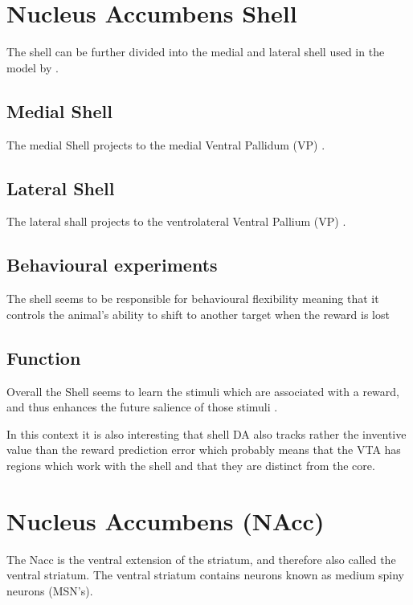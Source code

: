 \documentclass[12pt,a4paper]{article}
\let\oldsection\section
\renewcommand\section{\clearpage\oldsection}
\begin{document}
\section{Nucleus Accumbens Shell}

The shell can be further divided into the medial and lateral shell \citep{Ikemoto2007} \citep{Usuda1998} used in the model by \citep{Humphries2010}.

\subsection{Medial Shell}

The medial Shell projects to the medial Ventral Pallidum (VP) \citep{Ikemoto2007}.

\subsection{Lateral Shell}

The lateral shall projects to the ventrolateral Ventral Pallium (VP) \citep{Ikemoto2007}.


\subsection{Behavioural experiments}

The shell seems to be responsible for behavioural flexibility meaning that it controls the animal's ability to shift to another target when the reward is lost \citep{Aquili2014}

\subsection{Function}

Overall the Shell seems to learn the stimuli which are associated with a reward, and thus enhances the future salience of those stimuli \citep{Cassidy2017}.

In this context it is also interesting that shell DA also tracks rather the inventive value than the reward prediction error \citep{Sackett2017} which probably means that the VTA has regions which work with the shell and that they are distinct from the core.




\section{Nucleus Accumbens (NAcc)}

The Nacc is the ventral extension of the striatum, and therefore also called the ventral striatum.  The ventral striatum contains neurons known as medium spiny neurons (MSN's).
\end{document}
